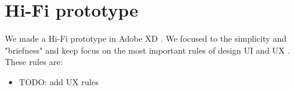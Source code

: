\section{Hi-Fi prototype}\label{sec:hi-fi-prototype}
We made a Hi-Fi prototype in Adobe XD .
We focused to the simplicity and "briefness" and keep focus on the most important rules of design UI and UX .
These rules are:
\begin{itemize}
    \item TODO: add UX rules
\end{itemize}







